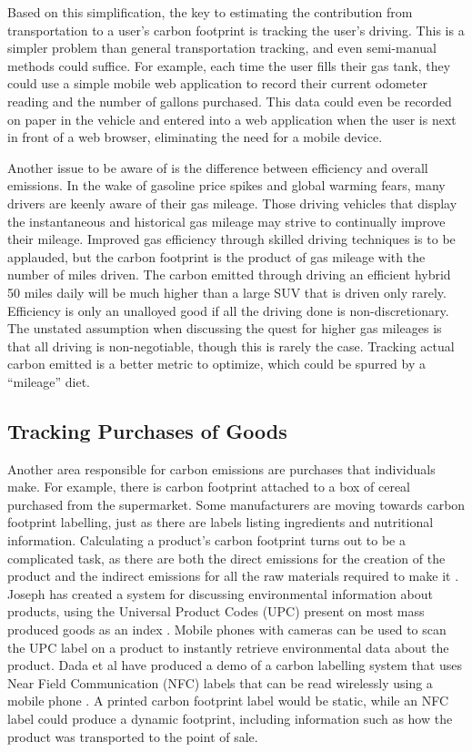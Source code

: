 Based on this simplification, the key to estimating the contribution from transportation to a user's carbon footprint is tracking the user's driving. This is a simpler problem than general transportation tracking, and even semi-manual methods could suffice. For example, each time the user fills their gas tank, they could use a simple mobile web application to record their current odometer reading and the number of gallons purchased. This data could even be recorded on paper in the vehicle and entered into a web application when the user is next in front of a web browser, eliminating the need for a mobile device.

Another issue to be aware of is the difference between efficiency and overall emissions. In the wake of gasoline price spikes and global warming fears, many drivers are keenly aware of their gas mileage. Those driving vehicles that display the instantaneous and historical gas mileage may strive to continually improve their mileage. Improved gas efficiency through skilled driving techniques is to be applauded, but the carbon footprint is the product of gas mileage with the number of miles driven. The carbon emitted through driving an efficient hybrid 50 miles daily will be much higher than a large SUV that is  driven only rarely. Efficiency is only an unalloyed good if all the driving done is non-discretionary. The unstated assumption when discussing the quest for higher gas mileages is that all driving is non-negotiable, though this is rarely the case. Tracking actual carbon emitted is a better metric to optimize, which could be spurred by a ``mileage'' diet.

\subsection{Tracking Purchases of Goods}
Another area responsible for carbon emissions are purchases that individuals make. For example, there is carbon footprint attached to a box of cereal purchased from the supermarket. Some manufacturers are moving towards carbon footprint labelling, just as there are labels listing ingredients and nutritional information. Calculating a product's carbon footprint turns out to be a complicated task, as there are both the direct emissions for the creation of the product and the indirect emissions for all the raw materials required to make it \cite{Wiedmann2007carbon-footprint}. Joseph has created a system for discussing environmental information about products, using the Universal Product Codes (UPC) present on most mass produced goods as an index \cite{Joseph2009Ecoproductpedia}. Mobile phones with cameras can be used to scan the UPC label on a product to instantly retrieve environmental data about the product. Dada et al have produced a demo of a carbon labelling system that uses Near Field Communication (NFC) labels that can be read wirelessly using a mobile phone \cite{dada-demo-pervasive-2008}. A printed carbon footprint label would be static, while an NFC label could produce a dynamic footprint, including information such as how the product was transported to the point of sale.

